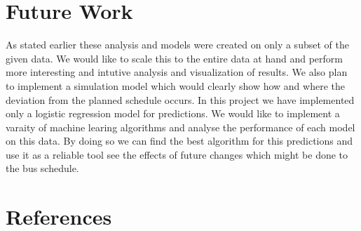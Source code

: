 \documentclass[12pt]{article}\usepackage[]{graphicx}\usepackage[]{color}
\begin{document}
\section{Future Work}
As stated earlier these analysis and models were created on only a subset of the given data. We would like to scale this to the entire data at hand and perform  more interesting and intutive analysis and visualization of results. We also plan to implement a simulation model which would clearly show how and where the deviation from the planned schedule occurs. In this project we have implemented only a logistic regression model for predictions. We would like to implement a varaity of machine learing algorithms and analyse the performance of each model on this data. By doing so we can find the best algorithm for this predictions and use it as a reliable tool see the effects of future changes which might be done to the bus schedule.   

\section{References}
 
	
\end{document}
